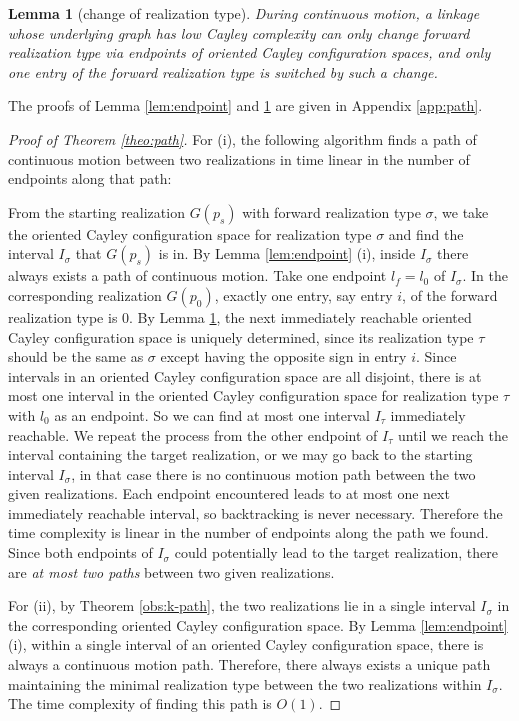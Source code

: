 \documentclass[secthm,amsthm,english]{article}
\newtheorem{lemma}{Lemma}
\theoremstyle{definition}
\theoremstyle{remark}
\begin{document}
\begin{lemma}[change of realization type] \label{lem:reachable}
During continuous motion, 
a linkage whose underlying graph has low Cayley complexity can only change forward realization type via endpoints of oriented Cayley configuration spaces, 
and only one entry of the forward realization type is switched by such a change. 
\end{lemma}

The proofs of Lemma \ref{lem:endpoint} and \ref{lem:reachable} are given in Appendix \ref{app:path}.




\begin{proof}[Proof of Theorem \ref{theo:path}]
For (i), the following algorithm finds a path of continuous motion between two realizations in time linear in the number of endpoints along that path: 

From the starting realization $G(p_s)$ with forward realization type $\sigma$, 
we take the oriented Cayley configuration space for realization type $\sigma$ and find the interval $I_\sigma$ that $G(p_s)$ is in. 
By Lemma \ref{lem:endpoint} (i), inside $I_\sigma$ there always exists a path of continuous motion. 
Take one endpoint $l_f = l_0$ of $I_\sigma$. 
In the corresponding realization $G(p_0)$, exactly one entry, say entry $i$, of the forward realization type is $0$. 
By Lemma \ref{lem:reachable}, 
the next immediately reachable oriented Cayley configuration space 
is uniquely determined, 
since its realization type $\tau$ should be the same as $\sigma$ except having the opposite sign in entry $i$.
Since intervals in an oriented Cayley configuration space are all disjoint, 
there is at most one interval in the oriented Cayley configuration space for realization type $\tau$ with $l_0$ as an endpoint. So 
we can find at most one interval $I_\tau$ immediately reachable. 
We repeat the process from the other endpoint of $I_\tau$ until we reach the interval containing the target realization, or we may go back to the starting interval $I_\sigma$, 
in that case there is no continuous motion path between the two given realizations. 
Each endpoint encountered leads to at most one next immediately reachable interval, so backtracking is never necessary.
Therefore the time complexity is linear in the number of endpoints along the path we found.
Since both endpoints of $I_\sigma$ could potentially lead to the target realization, 
there are \emph{at most two paths} between two given realizations. 


For (ii), by Theorem \ref{obs:k-path}, the two realizations lie in a single interval $I_\sigma$ in the corresponding oriented Cayley configuration space. 
By Lemma \ref{lem:endpoint} (i),
within a single interval of an oriented Cayley configuration space, there is always a continuous motion path.  
Therefore, there always exists a unique path maintaining the minimal realization type between the two realizations within $I_\sigma$. 
The time complexity of finding this path is $O(1)$. 
\end{proof}
\end{document}
